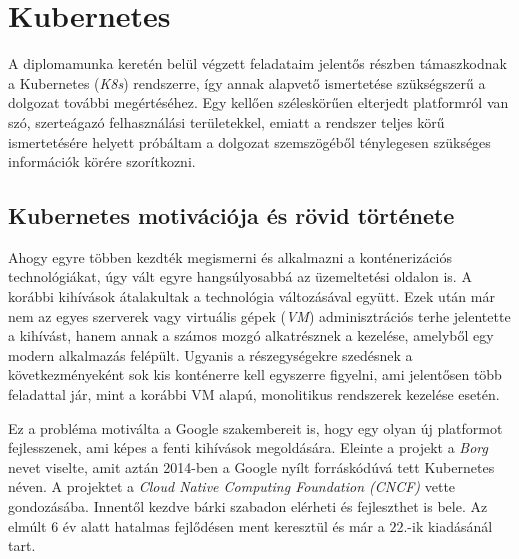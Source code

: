 \chapter{Kubernetes}
\label{sec:Kubernetes}
A diplomamunka keretén belül végzett feladataim jelentős részben támaszkodnak a Kubernetes (\textit{K8s}) rendszerre, így annak alapvető ismertetése szükségszerű a dolgozat további megértéséhez.
Egy kellően széleskörűen elterjedt platformról van szó, szerteágazó felhasználási területekkel, emiatt a rendszer teljes körű ismertetésére helyett próbáltam a dolgozat szemszögéből ténylegesen szükséges információk körére szorítkozni.

\section{Kubernetes motivációja és rövid története}
Ahogy egyre többen kezdték megismerni és alkalmazni a konténerizációs technológiákat, úgy vált egyre hangsúlyosabbá az üzemeltetési oldalon is.
A korábbi kihívások átalakultak a technológia változásával együtt. 
Ezek után már nem az egyes szerverek vagy virtuális gépek (\textit{VM}) adminisztrációs terhe jelentette a kihívást, hanem annak a számos mozgó alkatrésznek a kezelése, amelyből egy modern alkalmazás felépült.
Ugyanis a részegységekre szedésnek a következményeként sok kis konténerre kell egyszerre figyelni, ami jelentősen több feladattal jár, mint a korábbi VM alapú, monolitikus rendszerek kezelése esetén.

Ez a probléma motiválta a Google szakembereit is, hogy egy olyan új platformot fejlesszenek, ami képes a fenti kihívások megoldására.
Eleinte a projekt a \textit{Borg}\citep{Borg} nevet viselte, amit aztán 2014-ben a Google nyílt forráskódúvá tett Kubernetes néven.
A projektet a \textit{Cloud Native Computing Foundation (\textit{CNCF})}\citep{cncf} vette gondozásába.
Innentől kezdve bárki szabadon elérheti és fejleszthet is bele.
Az elmúlt 6 év alatt hatalmas fejlődésen ment keresztül és már a $22$.-ik kiadásánál tart.

